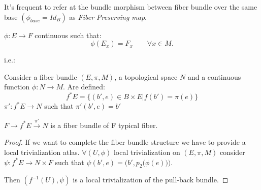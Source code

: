 \documentclass[a4paper,12pt]{scrartcl}    %
\begin{document}
\begin{notationfix}
It's frequent to refer at the bundle morphism between fiber bundle over the same base $( \phi_{base} = Id_{B} )$ as \emph{Fiber Preserving map}.

$\phi: E \rightarrow F $ continuous such that:
\begin{displaymath}
\phi(E_{x})= F_{x} \qquad \forall x \in M.
\end{displaymath}

i.e.:

\end{notationfix}

\begin{definition}
Consider a fiber bundle $(E,\pi,M)$, a topological space $N$ and a continuous function $\phi: N \rightarrow M$.
Are defined:
\begin{displaymath}
f^* E =  \{ (b',e) \in B \times E \vert f(b') = \pi(e) \} 
\end{displaymath}
$\pi':f^* E \rightarrow N $ such that $ \pi' (b',e) = b' $


\end{definition}

\begin{proposition}
$F \rightarrow f^* E \xrightarrow{\pi'} N$ is a fiber bundle of F typical fiber.
\end{proposition}
\begin{proof}
If we want to complete the fiber bundle structure we have to provide a local trivialization atlas.
$\forall ( U, \phi)$ local trivialization on $(E, \pi, M)$  consider $\psi: f^* E \rightarrow N \times F$ such that $\psi( b',e) = \bigg( b', p_2 \big( \phi(e)\big)\bigg)$.

Then $(f^{-1}(U),\psi)$ is a local trivialization of the pull-back bundle.
\end{proof}
\end{document}
